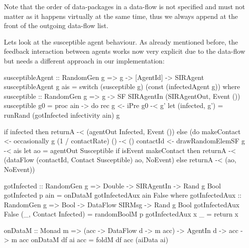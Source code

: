 Note that the order of data-packages in a data-flow is not specified and must not matter as it happens virtually at the same time, thus we always append at the front of the outgoing data-flow list.

Lets look at the susceptible agent behaviour. As already mentioned before, the feedback interaction between agents works now very explicit due to the data-flow but needs a different approach in our implementation:

\begin{HaskellCode}
susceptibleAgent :: RandomGen g => g -> [AgentId] -> SIRAgent
susceptibleAgent g ais = switch (susceptible g) (const (infectedAgent g))
  where
    susceptible :: RandomGen g => g -> SF SIRAgentIn (SIRAgentOut, Event ())
    susceptible g0 = proc ain -> do
      rec
        g <- iPre g0 -< g'
        let (infected, g') = runRand (gotInfected infectivity ain) g

      if infected 
        then returnA -< (agentOut Infected, Event ())
        else (do
          makeContact <- occasionally g (1 / contactRate) () -< ()
          contactId   <- drawRandomElemSF g                  -< ais
          let ao = agentOut Susceptible
          if isEvent makeContact
            then returnA -< (dataFlow (contactId, Contact Susceptible) ao, NoEvent)
            else returnA -< (ao, NoEvent))
            
gotInfected :: RandomGen g => Double -> SIRAgentIn -> Rand g Bool
gotInfected p ain = onDataM gotInfectedAux ain False
  where
    gotInfectedAux :: RandomGen g => Bool -> DataFlow SIRMsg -> Rand g Bool
    gotInfectedAux False (_, Contact Infected) = randomBoolM p
    gotInfectedAux x _ = return x
    
onDataM :: Monad m => (acc -> DataFlow d -> m acc) -> AgentIn d -> acc -> m acc
onDataM df ai acc = foldM df acc (aiData ai)
\end{HaskellCode}

